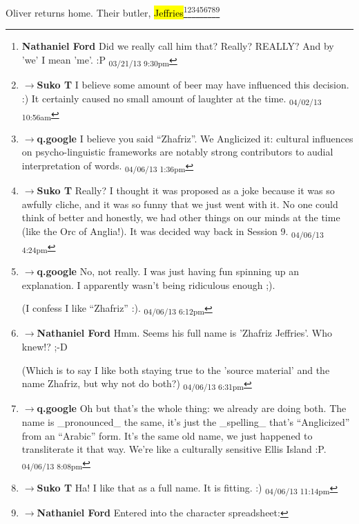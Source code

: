 Oliver returns home.  Their butler, \hl{Jeffries}\footnote{\textbf{Nathaniel Ford }Did we really call him that? Really? REALLY? And by 'we' I mean 'me'. :P \textsubscript{03/21/13 9:30pm}}\footnote{$\rightarrow$\textbf{Suko T }I believe some amount of beer may have influenced this decision. :)  It certainly caused no small amount of laughter at the time. \textsubscript{04/02/13 10:56am}}\footnote{$\rightarrow$\textbf{q.google }I believe you said ``Zhafriz''.  We Anglicized it: cultural influences on psycho-linguistic frameworks are notably strong contributors to audial interpretation of words. \textsubscript{04/06/13 1:36pm}}\footnote{$\rightarrow$\textbf{Suko T }Really?  I thought it was proposed as a joke because it was so awfully cliche, and it was so funny that we just went with it.  No one could think of better and honestly, we had other things on our minds at the time (like the Orc of Anglia!).  It was decided way back in Session 9. \textsubscript{04/06/13 4:24pm}}\footnote{$\rightarrow$\textbf{q.google }No, not really.  I was just having fun spinning up an explanation.  I apparently wasn't being ridiculous enough ;).

(I confess I like ``Zhafriz'' :). \textsubscript{04/06/13 6:12pm}}\footnote{$\rightarrow$\textbf{Nathaniel Ford }Hmm. Seems his full name is 'Zhafriz Jeffries'. Who knew!? ;-D

(Which is to say I like both staying true to the 'source material' and the name Zhafriz, but why not do both?) \textsubscript{04/06/13 6:31pm}}\footnote{$\rightarrow$\textbf{q.google }Oh but that's the whole thing: we already are doing both. The name is \_pronounced\_ the same, it's just the \_spelling\_ that's ``Anglicized'' from an ``Arabic'' form.  It's the same old name, we just happened to transliterate it that way.  We're like a culturally sensitive Ellis Island :P. \textsubscript{04/06/13 8:08pm}}\footnote{$\rightarrow$\textbf{Suko T }Ha!  I like that as a full name.  It is fitting. :) \textsubscript{04/06/13 11:14pm}}\footnote{$\rightarrow$\textbf{Nathaniel Ford }Entered into the character spreadsheet: 

}
